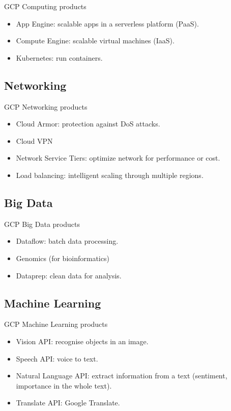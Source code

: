 \documentclass{beamer}
\begin{document}
\begin{frame}[fragile]{GCP Computing products}
  \begin{itemize}
    \item App Engine: scalable apps in a serverless platform (PaaS).
    \item Compute Engine: scalable virtual machines (IaaS).
    \item Kubernetes: run containers.
  \end{itemize}
\end{frame}

\subsection{Networking}

\begin{frame}[fragile]{GCP Networking products}
  \begin{itemize}
    \item Cloud Armor: protection against DoS attacks.
    \item Cloud VPN
    \item Network Service Tiers: optimize network for performance or cost.
    \item Load balancing: intelligent scaling through multiple regions.
  \end{itemize}
\end{frame}

\subsection{Big Data}

\begin{frame}[fragile]{GCP Big Data products}
  \begin{itemize}
    \item Dataflow: batch data processing.
    \item Genomics (for bioinformatics)
    \item Dataprep: clean data for analysis.
  \end{itemize}
\end{frame}

\subsection{Machine Learning}

\begin{frame}[fragile]{GCP Machine Learning products}
  \begin{itemize}
    \item Vision API: recognise objects in an image.
    \item Speech API: voice to text.
    \item Natural Language API: extract information from a text (sentiment, importance in the whole text).
    \item Translate API: Google Translate.
  \end{itemize}
\end{frame}
\end{document}
